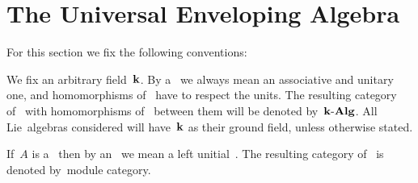\chapter{The Universal Enveloping Algebra}


\begin{convention}
  For this section we fix the following conventions:
  
  We fix an arbitrary field~$\kf$.
  By a~{\algebra{$\kf$}} we always mean an associative and unitary one, and homomorphisms of~{\algebras{$\kf$}} have to respect the units.
  The resulting category of~{\algebras{$\kf$}} with homomorphisms of~{\algebra{$\kf$}} between them will be denoted by~$\mathbf{k}\text{-}\mathbf{Alg}$.
  All Lie~algebras considered will have~$\kf$ as their ground field, unless otherwise stated.
  
  If~$A$ is a~{\algebra{$\kf$}} then by an~ we mean a left unitial~{}.
  The resulting category of~{} is denoted by~\gls*{module category}.
\end{convention}

% 
%   
% 

